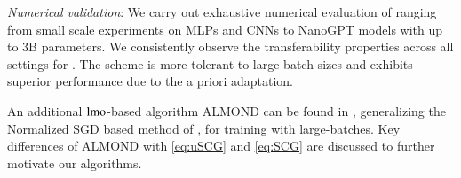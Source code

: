     
    \emph{Numerical validation}:
     We carry out exhaustive numerical evaluation of \Scion ranging from small scale experiments on MLPs and CNNs to NanoGPT models with up to 3B parameters.
     We consistently observe the transferability properties across all settings for \Scion.
     The scheme is more tolerant to large batch sizes and exhibits superior performance due to the a priori adaptation. 



An additional $\operatorname{lmo}$-based algorithm ALMOND can be found in , generalizing the Normalized SGD based method of \citet{zhao2020stochastic}, for training with large-batches. 
Key differences of ALMOND with \ref{eq:uSCG} and \ref{eq:SCG} are discussed to further motivate our algorithms.







